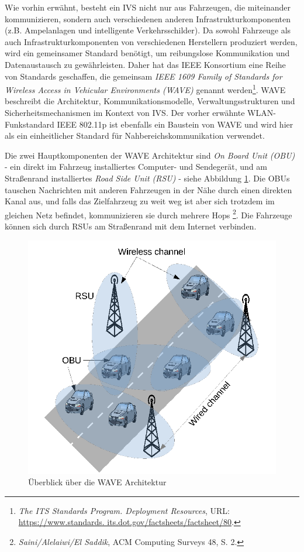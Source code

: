 Wie vorhin erwähnt, besteht ein IVS nicht nur aus Fahrzeugen, die miteinander kommunizieren, sondern auch verschiedenen anderen Infrastrukturkomponenten (z.B. Ampelanlagen und intelligente Verkehrsschilder). Da sowohl Fahrzeuge als auch Infrastrukturkomponenten von verschiedenen Herstellern produziert werden, wird ein gemeinsamer Standard benötigt, um reibungslose Kommunikation und Datenaustausch zu gewährleisten. Daher hat das IEEE Konsortium eine Reihe von Standards geschaffen, die gemeinsam \emph{IEEE 1609 Family of Standards for Wireless Access in Vehicular Environments (WAVE)} genannt werden\footnote{\emph{The ITS Standards Program. Deployment Resources}, URL: \url{ https://www.standards. its.dot.gov/factsheets/factsheet/80}.}\nocite{WAVE}. WAVE beschreibt die Architektur, Kommunikationsmodelle, Verwaltungsstrukturen und Sicherheitsmechanismen im Kontext von IVS. Der vorher erwähnte WLAN-Funkstandard IEEE 802.11p ist ebenfalls ein Baustein von WAVE und wird hier als ein einheitlicher Standard für Nahbereichskommunikation verwendet. 

Die zwei Hauptkomponenten der WAVE Architektur sind \emph{On Board Unit (OBU)} - ein direkt im Fahrzeug installiertes Computer- und Sendegerät, und am Straßenrand installiertes \emph{Road Side Unit (RSU)} - siehe Abbildung \ref{fig:vanet}. Die OBUs tauschen Nachrichten mit anderen Fahrzeugen in der Nähe durch einen direkten Kanal aus, und falls das Zielfahrzeug zu weit weg ist aber sich trotzdem im gleichen Netz befindet, kommunizieren sie durch mehrere Hops \footnote{\emph{Saini/Alelaiwi/El Saddik}, ACM Computing Surveys 48, S. 2.}\nocite{VANET}. Die Fahrzeuge können sich durch RSUs am Straßenrand mit dem Internet verbinden.

\begin{figure}
	\centering
	\includegraphics[width=0.7\linewidth]{images/VANET}
	\caption[Überblick über die WAVE Architektur]{Überblick über die WAVE Architektur \footnotemark \nocite{VANET}}
	\label{fig:vanet}
\end{figure}


